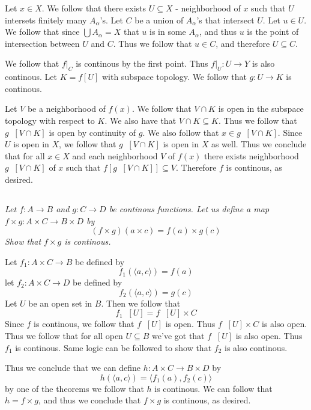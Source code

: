 \documentclass[11pt,oneside,titlepage]{book}
\DeclareMathOperator \inv {^{-1}}
\newcommand{\eangle}[1]{\langle #1 \rangle}
\begin{document}
Let $x \in X$. We follow that there
exists $U \subseteq X$ - neighborhood of $x$ such that $U$ intersets
finitely many $A_\alpha$'s. Let $C$ be a union of $A_\alpha$'s that intersect $U$.
Let $u \in U$. We follow that since $\bigcup{A_\alpha} = X$ that
$u$ is in some $A_\alpha$, and thus $u$ is the point of intersection between $U$
and $C$. Thus we follow that $u \in C$, and therefore $U \subseteq C$.

We follow that $f|_C$ is continous by the first point. Thus $f|_U: U \to Y$ is
also continous. Let $K = f[U]$ with subspace topology. We follow that $g: U \to K$ is
continous.

Let $V$ be a neighborhood of $f(x)$. We follow that $V \cap K$ is open in the subspace
topology with respect to $K$. We also have that $V \cap K \subseteq K$. Thus we follow that
$g\inv[V \cap K]$ is open by continuity of $g$. We also follow that $x \in g\inv[V \cap K]$.
Since $U$ is open in $X$, we follow that $g\inv[V \cap K]$ is open in $X$ as well.
Thus we conclude that for all $x \in X$ and each neighborhood $V$ of $f(x)$ there
exists neighborhood $g\inv[V \cap K]$ of $x$ such that $f[g\inv[V \cap K]] \subseteq V$.
Therefore $f$ is continous, as desired.

\subsection{}

\textit{Let $f: A \to B$ and $g: C \to D$ be continous functions. Let us define a map
  $f \times g: A \times C \to B \times D$ by
  $$(f \times g)(a \times c) = f(a) \times g(c)$$
  Show that $f \times g$ is continous.}

Let $f_1: A \times C \to B$ be defined by
$$f_1(\eangle{a, c}) = f(a)$$
let $f_2: A \times C \to D$ be defined by
$$f_2(\eangle{a, c}) = g(c)$$
Let $U$ be an open set in $B$. Then we follow that
$$f_1\inv[U] = f\inv[U] \times C$$
Since $f$ is continous, we follow that $f\inv[U]$ is open. Thus $f\inv[U] \times C$ is
also open. Thus we follow that for all open $U \subseteq B$ we've got that $f\inv[U]$
is also open. Thus $f_1$ is continous. Same logic can be followed to show that $f_2$
is also continous.

Thus we conclude that we can define $h: A \times C \to B \times D$ by
$$h(\eangle{a, c}) = \eangle{f_1(a), f_2(c)}$$
by one of the theorems we follow that $h$ is continous.
We can follow that $h = f \times g$, and thus we conclude that $f \times g$ is
continous, as desired.
\end{document}
